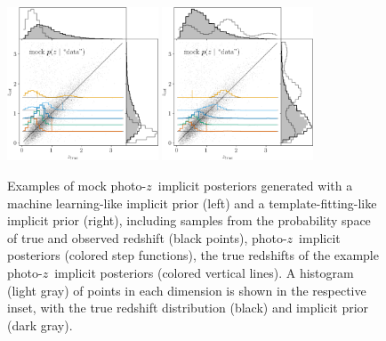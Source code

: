 \documentclass[iop]{emulateapj}
\newcommand{\pz}{photo-$z$}
\newcommand{\pzip}{\pz\ implicit posterior}
\begin{document}
\begin{figure}
	\begin{center}
		\includegraphics[width=0.4\textwidth]{data_prior_training.png}
		\includegraphics[width=0.4\textwidth]{data_prior_template.png}
		\caption{
			Examples of mock \pzip s generated with a machine learning-like implicit prior (left) and a template-fitting-like implicit prior (right), including samples from the probability space of true and observed redshift (black points), \pzip s (colored step functions), the true redshifts of the example \pzip s (colored vertical lines).
			A histogram (light gray) of points in each dimension is shown in the respective inset, with the true redshift distribution (black) and implicit prior (dark gray).
		}
		\label{fig:pzs-priors}
	\end{center}
\end{figure}
\end{document}
